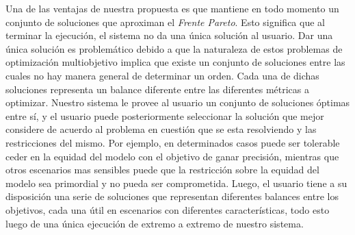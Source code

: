 Una de las ventajas de nuestra propuesta es que mantiene en todo momento un conjunto de soluciones que aproximan el \emph{Frente Pareto}.
Esto significa que al terminar la ejecución, el sistema no da una única solución al usuario.
Dar una única solución es problemático debido a que la naturaleza de estos problemas de optimización multiobjetivo implica que existe un conjunto de soluciones entre las cuales no hay manera general de determinar un orden.
Cada una de dichas soluciones representa un balance diferente entre las diferentes métricas a optimizar.
Nuestro sistema le provee al usuario un conjunto de soluciones óptimas entre sí, y el usuario puede posteriormente seleccionar la solución que mejor considere de acuerdo al problema en cuestión que se esta resolviendo y las restricciones del mismo.
Por ejemplo, en determinados casos puede ser tolerable ceder en la equidad del modelo con el objetivo de ganar precisión, mientras que otros escenarios mas sensibles puede que la restricción sobre la equidad del modelo sea primordial y no pueda ser comprometida.
Luego, el usuario tiene a su disposición una serie de soluciones que representan diferentes balances entre los objetivos, cada una útil en escenarios con diferentes características, todo esto luego de una única ejecución de extremo a extremo de nuestro sistema.


